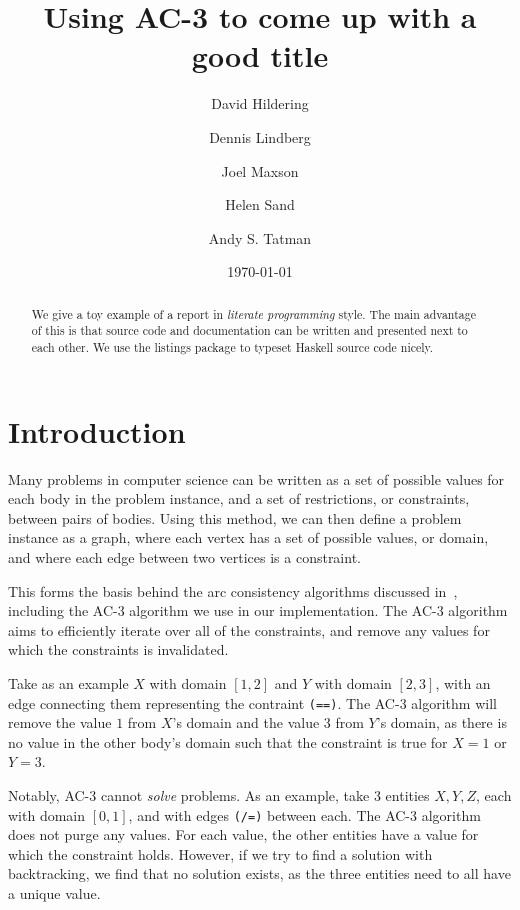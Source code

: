 \documentclass[12pt,a4paper]{article}
\title{Using AC-3 to come up with a good title}
\author{David Hildering \and Dennis Lindberg \and Joel Maxson \and Helen Sand \and Andy S. Tatman}
\date{\today}
\begin{document}
\maketitle

\begin{abstract}
We give a toy example of a report in \emph{literate programming} style.
The main advantage of this is that source code and documentation can
be written and presented next to each other.
We use the listings package to typeset Haskell source code nicely.
\end{abstract}

\vfill

\tableofcontents

\clearpage


% 

\section{Introduction}
Many problems in computer science can be written as a set of possible values for each 
body in the problem instance, and a set of restrictions, or constraints, between pairs of bodies.
Using this method, we can then define a problem instance as a graph, where each vertex has a set of possible values, or domain,
and where each edge between two vertices is a constraint.  

This forms the basis behind the arc consistency algorithms discussed in~\cite{AC3}, including the AC-3 algorithm 
we use in our implementation. 
The AC-3 algorithm aims to efficiently iterate over all of the constraints, 
and remove any values for which the constraints is invalidated.

Take as an example $X$ with domain $[1,2]$ and $Y$ with domain $[2,3]$, with an edge connecting them representing the contraint \verb:(==):.
The AC-3 algorithm will remove the value $1$ from $X$'s domain and the value $3$ from $Y$'s domain, 
as there is no value in the other body's domain such that the constraint is true for $X=1$ or $Y=3$.


Notably, AC-3 cannot \emph{solve} problems. As an example, take 3 entities $X,Y,Z$, 
each with domain $[0,1]$, and with edges \verb:(/=): between each. 
The AC-3 algorithm does not purge any values. For each value, the other entities have a 
value for which the constraint holds.
However, if we try to find a solution with backtracking, we find that no solution exists, as 
the three entities need to all have a unique value. 
\end{document}
